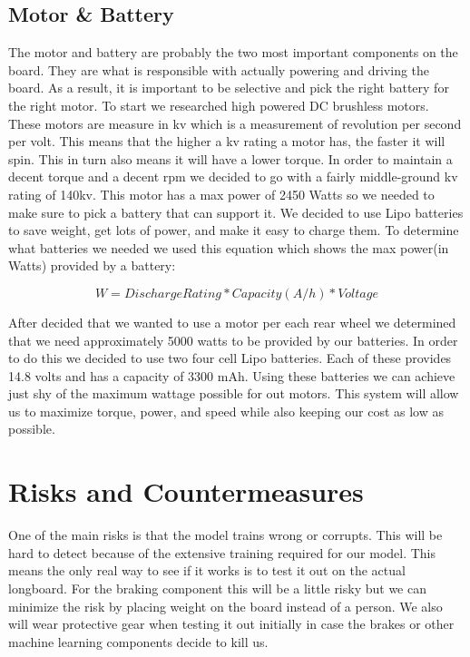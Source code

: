 \documentclass{article}
\begin{document}
\subsection{Motor \& Battery}
The motor and battery are probably the two most important components on the board. They are what is responsible with actually powering and driving the board. As a result, it is important to be selective and pick the right battery for the right motor. To start we researched high powered DC brushless motors. These motors are measure in kv which is a measurement of revolution per second per volt. This means that the higher a kv rating a motor has, the faster it will spin. This in turn also means it will have a lower torque. In order to maintain a decent torque and a decent rpm we decided to go with a fairly middle-ground kv rating of 140kv. This motor has a max power of 2450 Watts so we needed to make sure to pick a battery that can support it. We decided to use Lipo batteries to save weight, get lots of power, and make it easy to charge them. To determine what batteries we needed we used this equation which shows the max power(in Watts) provided by a battery:

\begin{equation}
W = DischargeRating * Capacity(A/h) * Voltage
\end{equation}

After decided that we wanted to use a motor per each rear wheel we determined that we need approximately 5000 watts to be provided by our batteries. In order to do this we decided to use two four cell Lipo batteries. Each of these provides 14.8 volts and has a capacity of 3300 mAh. Using these batteries we can achieve just shy of the maximum wattage possible for out motors. This system will allow us to maximize torque, power, and speed while also keeping our cost as low as possible.


\section{Risks and Countermeasures}
One of the main risks is that the model trains wrong or corrupts. This will be hard to detect because of the extensive training required for our model. This means the only real way to see if it works is to test it out on the actual longboard. For the braking component this will be a little risky but we can minimize the risk by placing weight on the board instead of a person. We also will wear protective gear when testing it out initially in case the brakes or other machine learning components decide to kill us.
\end{document}
